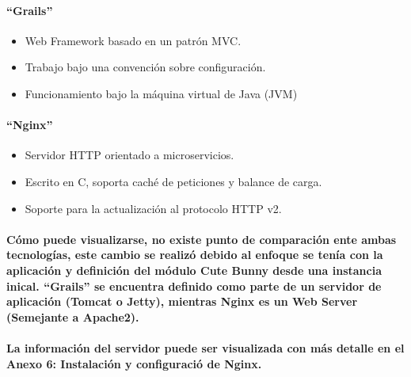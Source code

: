     \paragraph{``Grails''}    
    \begin{itemize}
      \item Web Framework basado en un patrón MVC.
      \item Trabajo bajo una convención sobre configuración.
      \item Funcionamiento bajo la máquina virtual de Java (JVM)
    \end{itemize}
    \paragraph{``Nginx''}    
    \begin{itemize}
      \item Servidor HTTP orientado a microservicios.
      \item Escrito en C, soporta caché de peticiones y balance de carga.
      \item Soporte para la actualización al protocolo HTTP v2.
    \end{itemize}
    \paragraph{Cómo puede visualizarse, no existe punto de comparación ente ambas tecnologías, este cambio se realizó debido al enfoque se tenía con la aplicación y definición del módulo Cute Bunny desde una instancia inical. ``Grails'' se encuentra definido como parte de un servidor de aplicación (Tomcat o Jetty), mientras Nginx es un Web Server (Semejante a Apache2).}
    \paragraph{La información del servidor puede ser visualizada con más detalle en el Anexo 6: Instalación y configuració de Nginx.}  
